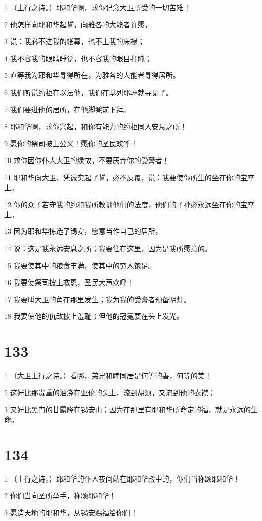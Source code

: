 \par 1 （上行之诗。）耶和华啊，求你记念大卫所受的一切苦难！
\par 2 他怎样向耶和华起誓，向雅各的大能者许愿，
\par 3 说：我必不进我的帐幕，也不上我的床榻；
\par 4 我不容我的眼睛睡觉，也不容我的眼目打盹；
\par 5 直等我为耶和华寻得所在，为雅各的大能者寻得居所。
\par 6 我们听说约柜在以法他，我们在基列耶琳就寻见了。
\par 7 我们要进他的居所，在他脚凳前下拜。
\par 8 耶和华啊，求你兴起，和你有能力的约柜同入安息之所！
\par 9 愿你的祭司披上公义！愿你的圣民欢呼！
\par 10 求你因你仆人大卫的缘故，不要厌弃你的受膏者！
\par 11 耶和华向大卫、凭诚实起了誓，必不反覆，说：我要使你所生的坐在你的宝座上。
\par 12 你的众子若守我的约和我所教训他们的法度，他们的子孙必永远坐在你的宝座上。
\par 13 因为耶和华拣选了锡安，愿意当作自己的居所，
\par 14 说：这是我永远安息之所；我要住在这里，因为是我所愿意的。
\par 15 我要使其中的粮食丰满，使其中的穷人饱足。
\par 16 我要使祭司披上救恩，圣民大声欢呼！
\par 17 我要叫大卫的角在那里发生；我为我的受膏者预备明灯。
\par 18 我要使他的仇敌披上羞耻；但他的冠冕要在头上发光。

\chapter{133}

\par 1 （大卫上行之诗。）看哪，弟兄和睦同居是何等的善，何等的美！
\par 2 这好比那贵重的油浇在亚伦的头上，流到胡须，又流到他的衣襟；
\par 3 又好比黑门的甘露降在锡安山；因为在那里有耶和华所命定的福，就是永远的生命。

\chapter{134}

\par 1 （上行之诗。）耶和华的仆人夜间站在耶和华殿中的，你们当称颂耶和华！
\par 2 你们当向圣所举手，称颂耶和华！
\par 3 愿造天地的耶和华，从锡安赐福给你们！


